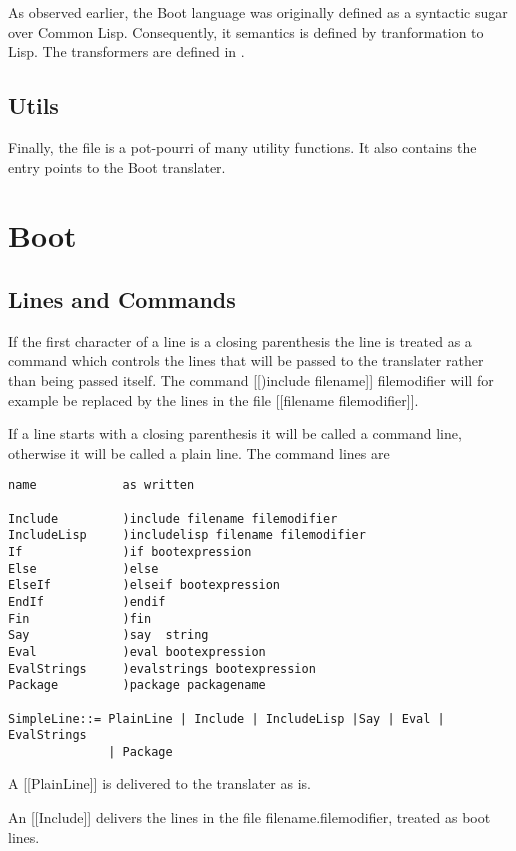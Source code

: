\documentclass{article}
\begin{document}
As observed earlier, the Boot language was originally defined as a syntactic
sugar over Common Lisp.  Consequently, it semantics is defined by
tranformation to Lisp.  The transformers are defined in
.

\subsection{Utils}
\label{sec:boot-to-cl:utils}

Finally, the file  is a pot-pourri of many utility
functions.  It also contains the entry points to the Boot translater.


\section{Boot}
\label{sec:boot}

\subsection{Lines and Commands}

If the first character of a line is a closing parenthesis the line
is treated as a command which controls the lines that will be
passed to the translater rather than being passed itself.
The command [[)include filename]] filemodifier will for example
be replaced by the lines in the file [[filename filemodifier]].

If a line starts with a closing parenthesis it will be called a command
line, otherwise it will be called a plain line.
The command lines are
\begin{verbatim}
name            as written

Include         )include filename filemodifier
IncludeLisp     )includelisp filename filemodifier
If              )if bootexpression
Else            )else
ElseIf          )elseif bootexpression
EndIf           )endif
Fin             )fin
Say             )say  string
Eval            )eval bootexpression
EvalStrings     )evalstrings bootexpression
Package         )package packagename

SimpleLine::= PlainLine | Include | IncludeLisp |Say | Eval | EvalStrings
              | Package
\end{verbatim}

A [[PlainLine]] is delivered to the translater as is.

An [[Include]] delivers the lines in the file filename.filemodifier,
treated as boot lines.
\end{document}
